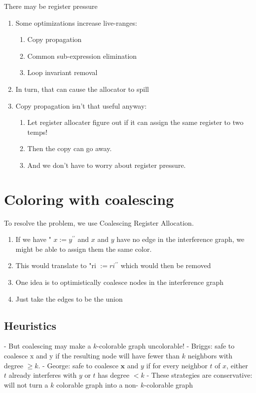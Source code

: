 \documentclass[a4paper]{exam}
\theoremstyle{definition}
\begin{document}
There may be register pressure
\begin{enumerate}
    \item Some optimizations increase live-ranges:

\begin{enumerate}
    \item Copy propagation
    \item Common sub-expression elimination
    \item Loop invariant removal
\end{enumerate} 
\item In turn, that can cause the allocator to spill
\item Copy propagation isn't that useful anyway:
\begin{enumerate}
 \item Let register allocater figure out if it can assign the same register to two temps!
 \item Then the copy can go away.
 \item And we don't have to worry about register pressure.
 \end{enumerate} 
\end{enumerate}
\section{Coloring with coalescing\cite{cs153lec21}}
To resolve the problem, we use Coalescing Register Allocation.
\begin{enumerate}
    \item  If we have " $x:=y^{\prime \prime}$ and $x$ and $y$ have no edge in the interference graph, we might be able to assign them the same color.
\item This would translate to "ri $:=r i^{\prime \prime}$ which would then be removed
\item One idea is to optimistically coalesce nodes in the interference graph
\item Just take the edges to be the union
\end{enumerate}
\subsection{Heuristics}
- But coalescing may make a $k$-colorable graph uncolorable!
- Briggs: safe to coalesce $\mathrm{x}$ and $\mathrm{y}$ if the resulting node will have fewer than $k$ neighbors with degree $\geq k$.
- George: safe to coalesce $\mathbf{x}$ and $y$ if for every neighbor $t$ of $x$, either $t$ already interferes with $y$ or $t$ has degree $<k$
- These strategies are conservative: will not turn a $k$ colorable graph into a non- $k$-colorable graph
\end{document}

